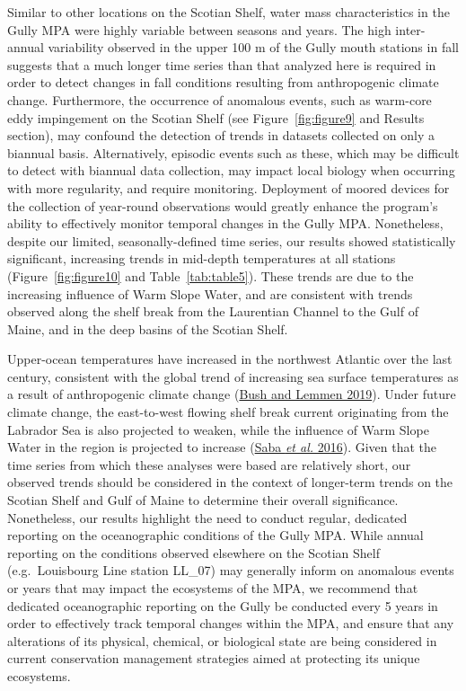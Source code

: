 \documentclass[12pt]{article}\usepackage[]{graphicx}\usepackage[]{color}
\begin{document}
Similar to other locations on the Scotian Shelf, water mass characteristics in the Gully MPA were highly variable between seasons and years. The high inter-annual variability observed in the upper 100 m of the Gully mouth stations in fall suggests that a much longer time series than that analyzed here is required in order to detect changes in fall conditions resulting from anthropogenic climate change. Furthermore, the occurrence of anomalous events, such as warm-core eddy impingement on the Scotian Shelf (see Figure~\ref{fig:figure9} and Results section), may confound the detection of trends in datasets collected on only a biannual basis. Alternatively, episodic events such as these, which may be difficult to detect with biannual data collection, may impact local biology when occurring with more regularity, and require monitoring. Deployment of moored devices for the collection of year-round observations would greatly enhance the program's ability to effectively monitor temporal changes in the Gully MPA. Nonetheless, despite our limited, seasonally-defined time series, our results showed statistically significant, increasing trends in mid-depth temperatures at all stations (Figure~\ref{fig:figure10} and Table~\ref{tab:table5}). These trends are due to the increasing influence of Warm Slope Water, and are consistent with trends observed along the shelf break from the Laurentian Channel to the Gulf of Maine, and in the deep basins of the Scotian Shelf.

Upper-ocean temperatures have increased in the northwest Atlantic over the last century, consistent with the global trend of increasing sea surface temperatures as a result of anthropogenic climate change (\protect\hyperlink{ref-bush_2019}{Bush and Lemmen 2019}). Under future climate change, the east-to-west flowing shelf break current originating from the Labrador Sea is also projected to weaken, while the influence of Warm Slope Water in the region is projected to increase (\protect\hyperlink{ref-saba_2016}{Saba \textit{et al.} 2016}). Given that the time series from which these analyses were based are relatively short, our observed trends should be considered in the context of longer-term trends on the Scotian Shelf and Gulf of Maine to determine their overall significance. Nonetheless, our results highlight the need to conduct regular, dedicated reporting on the oceanographic conditions of the Gully MPA. While annual reporting on the conditions observed elsewhere on the Scotian Shelf (e.g.~Louisbourg Line station LL\_07) may generally inform on anomalous events or years that may impact the ecosystems of the MPA, we recommend that dedicated oceanographic reporting on the Gully be conducted every 5 years in order to effectively track temporal changes within the MPA, and ensure that any alterations of its physical, chemical, or biological state are being considered in current conservation management strategies aimed at protecting its unique ecosystems.
\end{document}
